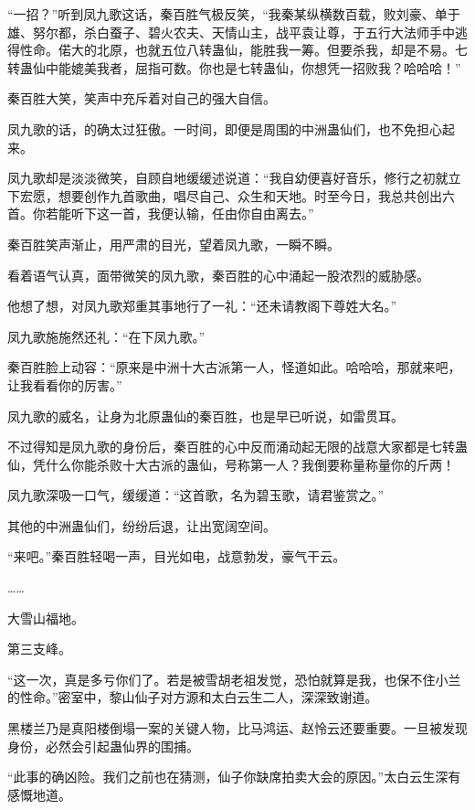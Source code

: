 
\begin{this_body}

“一招？”听到凤九歌这话，秦百胜气极反笑，“我秦某纵横数百载，败刘豪、单于雄、努尔都，杀白蚕子、碧火农夫、天情山主，战平袁让尊，于五行大法师手中逃得性命。偌大的北原，也就五位八转蛊仙，能胜我一筹。但要杀我，却是不易。七转蛊仙中能媲美我者，屈指可数。你也是七转蛊仙，你想凭一招败我？哈哈哈！”

秦百胜大笑，笑声中充斥着对自己的强大自信。

凤九歌的话，的确太过狂傲。一时间，即便是周围的中洲蛊仙们，也不免担心起来。

凤九歌却是淡淡微笑，自顾自地缓缓述说道：“我自幼便喜好音乐，修行之初就立下宏愿，想要创作九首歌曲，唱尽自己、众生和天地。时至今日，我总共创出六首。你若能听下这一首，我便认输，任由你自由离去。”

秦百胜笑声渐止，用严肃的目光，望着凤九歌，一瞬不瞬。

看着语气认真，面带微笑的凤九歌，秦百胜的心中涌起一股浓烈的威胁感。

他想了想，对凤九歌郑重其事地行了一礼：“还未请教阁下尊姓大名。”

凤九歌施施然还礼：“在下凤九歌。”

秦百胜脸上动容：“原来是中洲十大古派第一人，怪道如此。哈哈哈，那就来吧，让我看看你的厉害。”

凤九歌的威名，让身为北原蛊仙的秦百胜，也是早已听说，如雷贯耳。

不过得知是凤九歌的身份后，秦百胜的心中反而涌动起无限的战意大家都是七转蛊仙，凭什么你能杀败十大古派的蛊仙，号称第一人？我倒要称量称量你的斤两！

凤九歌深吸一口气，缓缓道：“这首歌，名为碧玉歌，请君鉴赏之。”

其他的中洲蛊仙们，纷纷后退，让出宽阔空间。

“来吧。”秦百胜轻喝一声，目光如电，战意勃发，豪气干云。

……

大雪山福地。

第三支峰。

“这一次，真是多亏你们了。若是被雪胡老祖发觉，恐怕就算是我，也保不住小兰的性命。”密室中，黎山仙子对方源和太白云生二人，深深致谢道。

黑楼兰乃是真阳楼倒塌一案的关键人物，比马鸿运、赵怜云还要重要。一旦被发现身份，必然会引起蛊仙界的围捕。

“此事的确凶险。我们之前也在猜测，仙子你缺席拍卖大会的原因。”太白云生深有感慨地道。


\end{this_body}
